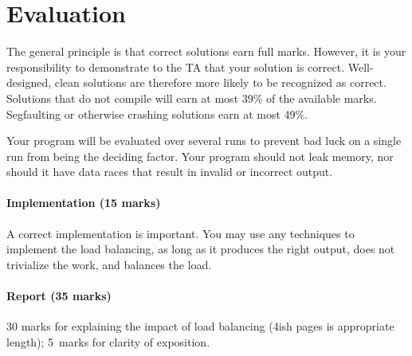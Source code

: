 \documentclass[letterpaper,10pt]{article}
\begin{document}
\section*{Evaluation}

The general principle is that correct solutions earn full marks.
However, it is your responsibility to demonstrate to the TA
that your solution is correct. Well-designed, clean solutions 
are therefore more likely to be recognized as correct. Solutions that do not compile will earn at most 39\% of the available
marks. Segfaulting or otherwise crashing solutions earn
at most 49\%.

Your program will be evaluated over several runs to prevent bad luck on a single run from being the deciding factor. Your program should not leak memory, nor should it have data races that result in invalid or incorrect output. 


\paragraph{Implementation (15 marks)} A correct implementation is important. You may use any techniques to implement the load balancing, as long as it produces the right output, does not trivialize the work, and balances the load.



\paragraph{Report (35 marks)} 30 marks for explaining the impact of load balancing (4ish pages is appropriate length); 5~marks for clarity of exposition.
\end{document}
